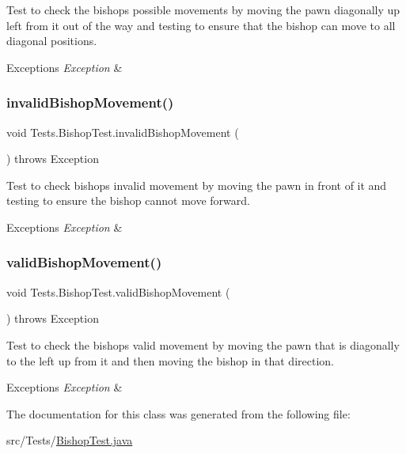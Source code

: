 Test to check the bishop\textquotesingle{}s possible movements by moving the pawn diagonally up left from it out of the way and testing to ensure that the bishop can move to all diagonal positions. 
\begin{DoxyExceptions}{Exceptions}
{\em Exception} & \\
\hline
\end{DoxyExceptions}
\hypertarget{class_tests_1_1_bishop_test_a3f1b2164ce04847f236b47960a2d6507}{}\label{class_tests_1_1_bishop_test_a3f1b2164ce04847f236b47960a2d6507} 
\subsubsection{\texorpdfstring{invalid\+Bishop\+Movement()}{invalidBishopMovement()}}
{\footnotesize\ttfamily void Tests.\+Bishop\+Test.\+invalid\+Bishop\+Movement (\begin{DoxyParamCaption}{ }\end{DoxyParamCaption}) throws Exception}

Test to check bishop\textquotesingle{}s invalid movement by moving the pawn in front of it and testing to ensure the bishop cannot move forward. 
\begin{DoxyExceptions}{Exceptions}
{\em Exception} & \\
\hline
\end{DoxyExceptions}
\hypertarget{class_tests_1_1_bishop_test_a5966af2d7a4cf4409a7c9e04e14be402}{}\label{class_tests_1_1_bishop_test_a5966af2d7a4cf4409a7c9e04e14be402} 
\subsubsection{\texorpdfstring{valid\+Bishop\+Movement()}{validBishopMovement()}}
{\footnotesize\ttfamily void Tests.\+Bishop\+Test.\+valid\+Bishop\+Movement (\begin{DoxyParamCaption}{ }\end{DoxyParamCaption}) throws Exception}

Test to check the bishop\textquotesingle{}s valid movement by moving the pawn that is diagonally to the left up from it and then moving the bishop in that direction. 
\begin{DoxyExceptions}{Exceptions}
{\em Exception} & \\
\hline
\end{DoxyExceptions}


The documentation for this class was generated from the following file\+:\begin{DoxyCompactItemize}
\item 
src/\+Tests/\hyperlink{_bishop_test_8java}{Bishop\+Test.\+java}\end{DoxyCompactItemize}
